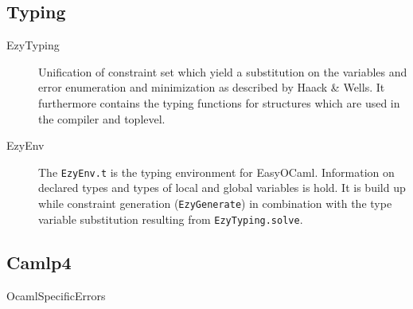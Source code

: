 \subsection{Typing}

\begin{description}
    \item[EzyTyping] Unification of constraint set which yield a 
        substitution on the variables and error enumeration and 
        minimization as described by Haack \& Wells.  It furthermore 
        contains the typing functions for structures which are used in 
        the compiler and toplevel.
    \item[EzyEnv] The \texttt{EzyEnv.t} is the typing environment 
        for EasyOCaml. Information on declared types and types of local 
        and global variables is hold.  It is build up while constraint 
        generation (\texttt{EzyGenerate}) in combination with the type 
        variable substitution resulting from \texttt{EzyTyping.solve}.
\end{description}


\subsection{Camlp4}
\begin{description}
  \item[OcamlSpecificErrors]
    \label{mod:ocamlspecificerrors}
\end{description}
